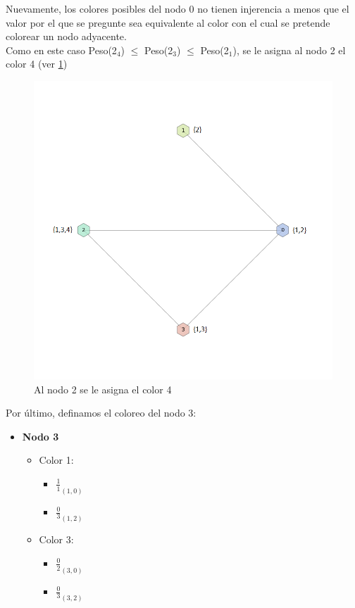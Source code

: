 Nuevamente, los colores posibles del nodo 0 no tienen injerencia a menos que el valor por el que se pregunte sea equivalente al color con el cual se pretende colorear un nodo adyacente.\\
Como en este caso  Peso(2$_{4}$) $\leq$  Peso(2$_{3}$)  $\leq$  Peso(2$_{1}$), se le asigna al nodo 2 el color 4 (ver \ref{3colores})

 \begin{figure}[H]
    \begin{center}
  	\includegraphics[width=13cm]{imagenes/ej3/4Nodos3.png}
 	\caption{Al nodo 2 se le asigna el color 4}
 	\label{3colores}
    \end{center}
  \end{figure}

Por último, definamos el coloreo del nodo 3:\\

\begin{itemize}
	\item \textbf{Nodo 3}
	\begin{itemize}
		\item Color 1:
		\begin{itemize}
			\item  $\frac{1}{1}_{(1,0)}$
			\item  $\frac{0}{3}_{(1,2)}$
		\end{itemize}

		\item Color 3:
		\begin{itemize}
			\item  $\frac{0}{2}_{(3,0)}$
			\item  $\frac{0}{3}_{(3,2)}$
		\end{itemize}
	\end{itemize}
\end{itemize}

